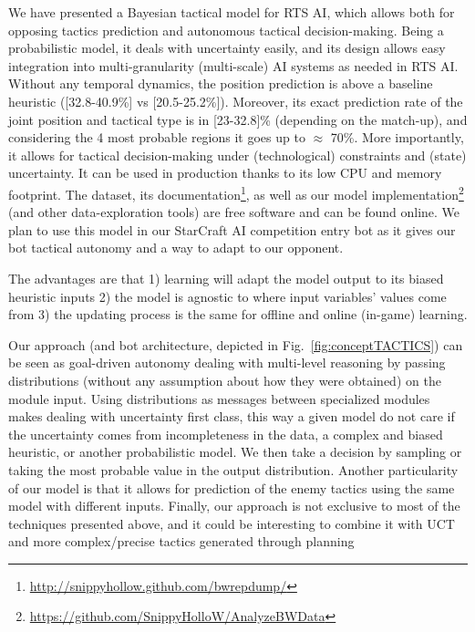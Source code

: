 We have presented a Bayesian tactical model for RTS AI, which allows both for opposing tactics prediction and autonomous tactical decision-making. Being a probabilistic model, it deals with uncertainty easily, and its design allows easy integration into multi-granularity (multi-scale) AI systems as needed in RTS AI. Without any temporal dynamics, the position prediction is above a baseline heuristic ([32.8-40.9\%] vs [20.5-25.2\%]). Moreover, its exact prediction rate of the joint position and tactical type is in [23-32.8]\% (depending on the match-up), and considering the 4 most probable regions it goes up to $\approx$ 70\%. More importantly, it allows for tactical decision-making under (technological) constraints and (state) uncertainty. It can be used in production thanks to its low CPU and memory footprint. The dataset, its documentation\footnote{\url{http://snippyhollow.github.com/bwrepdump/}}, as well as our model implementation\footnote{\url{https://github.com/SnippyHolloW/AnalyzeBWData}} (and other data-exploration tools) are free software and can be found online. We plan to use this model in our StarCraft AI competition entry bot as it gives our bot tactical autonomy and a way to adapt to our opponent.

The advantages are that 1) learning will adapt the model output to its biased heuristic inputs 2) the model is agnostic to where input variables' values come from 3) the updating process is the same for offline and online (in-game) learning. %

Our approach (and bot architecture, depicted in Fig.~\ref{fig:conceptTACTICS}) can be seen as goal-driven autonomy \cite{Weber2010cr} dealing with multi-level reasoning by passing distributions (without any assumption about how they were obtained) on the module input. Using distributions as messages between specialized modules makes dealing with uncertainty first class, this way a given model do not care if the uncertainty comes from incompleteness in the data, a complex and biased heuristic, or another probabilistic model. We then take a decision by sampling or taking the most probable value in the output distribution. Another particularity of our model is that it allows for prediction of the enemy tactics using the same model with different inputs. Finally, our approach is not exclusive to most of the techniques presented above, and it could be interesting to combine it with UCT \citep{UCT} and more complex/precise tactics generated through planning \citep{Chung05} %
